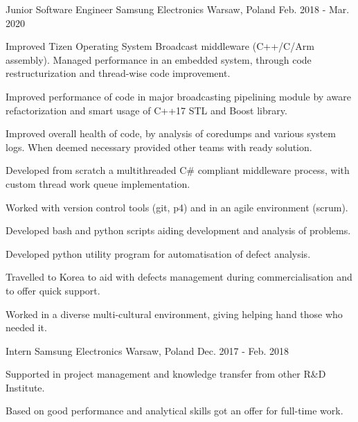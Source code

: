 

\begin{cventries}

  \cventry
    {Junior Software Engineer} %
    {Samsung Electronics} %
    {Warsaw, Poland} %
    {Feb. 2018 - Mar. 2020} %
    {
      \begin{cvitems} %
        \item {Improved Tizen Operating System Broadcast middleware (C++/C/Arm assembly). Managed performance in an embedded system, through code restructurization and thread-wise code improvement.}
        \item {Improved performance of code in major broadcasting pipelining module by aware refactorization and smart usage of C++17 STL and Boost library.}
        \item {Improved overall health of code, by analysis of coredumps and various system logs. When deemed necessary provided other teams with ready solution.}
        \item {Developed from scratch a multithreaded C# compliant middleware process, with custom thread work queue implementation.}
        \item {Worked with version control tools (git, p4) and in an agile environment (scrum).}
        \item {Developed bash and python scripts aiding development and analysis of problems.}
        \item {Developed python utility program for automatisation of defect analysis.}
        \item {Travelled to Korea to aid with defects management during commercialisation and to offer quick support.}
        \item {Worked in a diverse multi-cultural environment, giving helping hand those who needed it.}
      \end{cvitems}
    }

  \cventry
    {Intern} %
    {Samsung Electronics} %
    {Warsaw, Poland} %
    {Dec. 2017 - Feb. 2018} %
    {
      \begin{cvitems} %
        \item {Supported in project management and knowledge transfer from other R\&D Institute.}
        \item {Based on good performance and analytical skills got an offer for full-time work.}
      \end{cvitems}
    }


\end{cventries}
